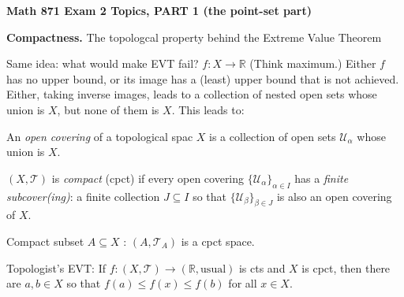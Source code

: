 \documentclass[12pt]{article}
\begin{document}
\def\ctln{\centerline}
\def\msk{\medskip}
\def\bsk{\bigskip}
\def\ssk{\smallskip}
\def\ra{\rightarrow}
\def\ubr{\underbar}
\def\sset{\subseteq}
\def\hsk{\hskip10pt}

\def\mt{{\mathcal T}}
\def\mb{{\mathcal B}}
\def\mbp{{\mathcal B}^\prime}
\def\mbpp{{\mathcal B}^{\prime\prime}}
\def\ms{{\mathcal S}}
\def\mu{{\mathcal U}}
\def\mv{{\mathcal V}}
\def\mp{{\mathcal P}}
\def\mtp{{\mathcal T}^\prime}
\def\mtpp{{\mathcal T}^{\prime\prime}}

\def\bbr{{\mathbb R}}
\def\bbz{{\mathbb Z}}
\def\bbq{{\mathbb Q}}
\def\spc{$~$\hskip.15in$~$}

\def\up{U^\prime}
\def\upp{U^{\prime\prime}}
\def\vp{V^\prime}
\def\vpp{V^{\prime\prime}}
\def\wp{W^\prime}
\def\wpp{W^{\prime\prime}}

\def\finv{f^{-1}}
\def\ginv{g^{-1}}
\def\hinv{h^{-1}}

\def\sset{\subseteq}
\def\lra{$\Leftrightarrow$}
\def\smin{\setminus}
\def\rta{$\Rightarrow$}
\def\rtta{\Rightarrow}


\ctln{\bf Math 871 Exam 2 Topics, PART 1 (the point-set part)}

\msk

{\bf Compactness.} The topologcal property behind the Extreme Value Theorem

\ssk

Same idea: what would make EVT fail? $f:X\ra \bbr$ (Think maximum.) Either 
$f$ has no upper bound, or its image has a (least) upper bound that is not
achieved. Either, taking inverse images, leads to a collection of nested
open sets whose union is $X$, but none of them is $X$. This leads to:

\ssk

An {\it open covering} of a topological spac $X$ is a collection of open sets
$\mu_\alpha$ whose union is $X$.


\ssk

$(X,\mt)$ is {\it compact} (cpct) if every open covering $\{\mu_\alpha\}_{\alpha\in I}$ has a
{\it finite subcover(ing)}: a finite collection $J\subseteq I$ so that
$\{\mu_\beta\}_{\beta\in J}$ is also an open covering of $X$.

\ssk

Compact subset $A\sset X$ : $(A,\mt_A)$ is a cpct space.

\ssk

Topologist's EVT: If $f:(X,\mt)\ra(\bbr,\textrm{usual})$ is cts and $X$ is cpct, then there
are $a,b\in X$ so that $f(a)\leq f(x)\leq f(b)$ for all $x\in X$.
\end{document}
